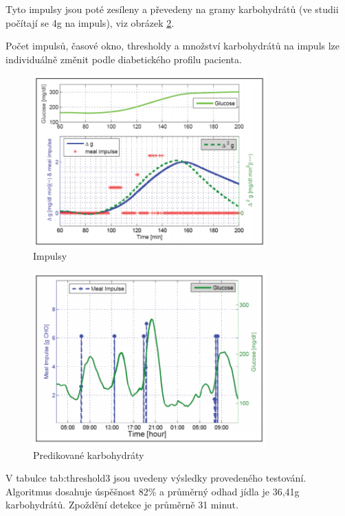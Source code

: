 Tyto impulsy jsou poté zesíleny a převedeny na gramy karbohydrátů (ve studii počítají se 4g na impuls), viz obrázek \ref{fig:threshold2}.

Počet impulsů, časové okno, thresholdy a množství karbohydrátů na impuls lze individuálně změnit podle diabetického profilu pacienta.

\begin{figure}[H]
\caption{Impulsy}
\label{fig:threshold1}
\centering
\includegraphics[width=0.8\textwidth]{img/analyza/threshold1.png}
\end{figure}
\begin{figure}[H]
\caption{Predikované karbohydráty}
\label{fig:threshold2}
\centering
\includegraphics[width=0.8\textwidth]{img/analyza/threshold2.png}
\end{figure}

V tabulce {tab:threshold3} jsou uvedeny výsledky provedeného testování. Algoritmus dosahuje úspěšnost 82\% a průměrný odhad jídla je 36,41g karbohydrátů. Zpoždění detekce je průměrně 31 minut.

